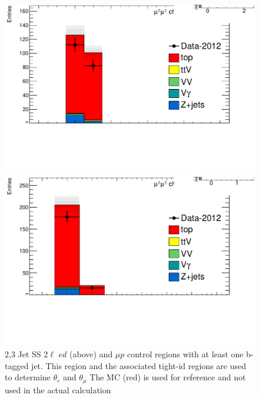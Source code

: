 \begin{figure}[htbp]
\begin{minipage}[h]{0.5\textwidth}
  \end{minipage}\hfill
  \begin{minipage}[h]{0.5\textwidth}
    \centering \includegraphics[width=\textwidth]{figs/fake/TaT-23jets-1b_nj_mm}
  \end{minipage}\hfill
  \begin{minipage}[h]{0.5\textwidth}
    \centering \includegraphics[width=\textwidth]{figs/fake/TaT-23jets-1b_nb_mm}
  \end{minipage}\hfill

  \caption{2,3 Jet SS 2$\ell$  $ed$ (above) and $\mu p$ control regions with at least one b-tagged jet. This region
    and the associated tight-id regions are used to determine $\theta_e$ and $\theta_{\mu}$ The \ttbar MC (red) is
  used for reference and not used in the actual calculation}
  \label{figure:background_23jets}
 \end{figure}

